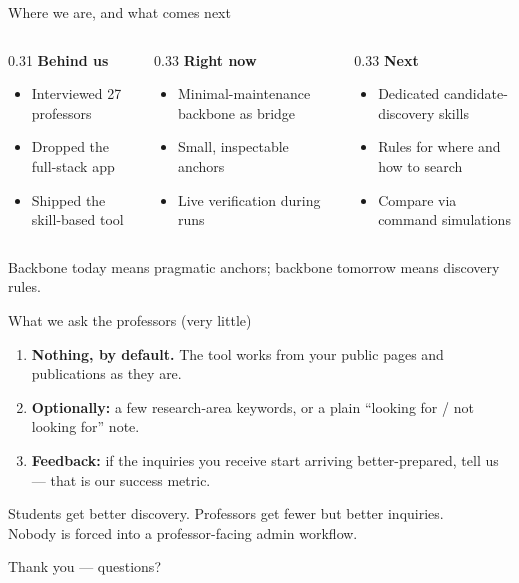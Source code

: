 \documentclass[11pt,aspectratio=169]{beamer}
\begin{document}
\begin{frame}{Where we are, and what comes next}
  \small
  \begin{columns}[T]
    \begin{column}{0.31\textwidth}
      \textbf{Behind us}
      \begin{itemize}
        \item Interviewed 27 professors
        \item Dropped the full-stack app
        \item Shipped the skill-based tool
      \end{itemize}
    \end{column}
    \begin{column}{0.33\textwidth}
      \textbf{Right now}
      \begin{itemize}
        \item Minimal-maintenance backbone as bridge
        \item Small, inspectable anchors
        \item Live verification during runs
      \end{itemize}
    \end{column}
    \begin{column}{0.33\textwidth}
      \textbf{Next}
      \begin{itemize}
        \item Dedicated candidate-discovery skills
        \item Rules for where and how to search
        \item Compare via command simulations
      \end{itemize}
    \end{column}
  \end{columns}
  \vspace{1.2em}
  \begin{center}
    \alert{Backbone today means pragmatic anchors; backbone tomorrow means discovery rules.}
  \end{center}
\end{frame}

\begin{frame}{What we ask the professors (very little)}
  \begin{enumerate}
    \item \textbf{Nothing, by default.} The tool works from your public pages
      and publications as they are.
    \item \textbf{Optionally:} a few research-area keywords, or a plain
      ``looking for / not looking for'' note.
    \item \textbf{Feedback:} if the inquiries you receive start arriving
      better-prepared, tell us --- that is our success metric.
  \end{enumerate}
  \vspace{0.6em}
  \begin{center}
    \alert{Students get better discovery. Professors get fewer but better inquiries.\\
    Nobody is forced into a professor-facing admin workflow.}
  \end{center}
\end{frame}

\begin{frame}[standout]
  Thank you --- questions?
\end{frame}
\end{document}
